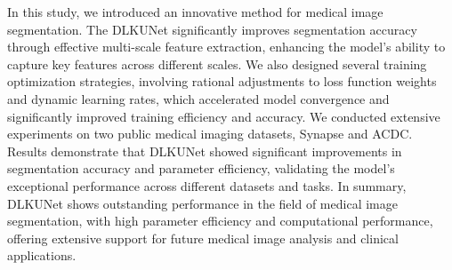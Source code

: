 \documentclass[sn-mathphys-num]{sn-jnl}
\theoremstyle{thmstyleone}%
\theoremstyle{thmstyletwo}%
\theoremstyle{thmstylethree}%
\begin{document}
In this study, we introduced an innovative method for medical image segmentation. 
The DLKUNet significantly improves segmentation accuracy through effective multi-scale feature extraction, enhancing the model's ability to capture key features across different scales.
We also designed several training optimization strategies, involving rational adjustments to loss function weights and dynamic learning rates, which accelerated model convergence and significantly improved training efficiency and accuracy.
We conducted extensive experiments on two public medical imaging datasets, Synapse and ACDC.
Results demonstrate that DLKUNet showed significant improvements in segmentation accuracy and parameter efficiency, validating the model's exceptional performance across different datasets and tasks.
In summary, DLKUNet shows outstanding performance in the field of medical image segmentation, with high parameter efficiency and computational performance, offering extensive support for future medical image analysis and clinical applications.

\end{document}
